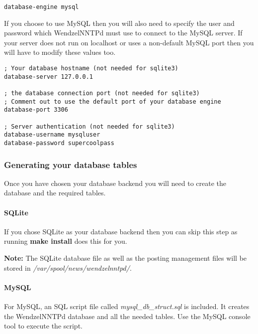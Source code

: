 \documentclass[12pt,fleqn,leqno]{scrbook}
\begin{document}
\begin{verbatim}
database-engine mysql
\end{verbatim}

If you choose to use MySQL then you will also need to specify the user
and password which WendzelNNTPd must use to connect to the MySQL server.
If your server does not run on localhost or uses a non-default MySQL
port then you will have to modify these values too.

\begin{verbatim}
; Your database hostname (not needed for sqlite3)
database-server 127.0.0.1

; the database connection port (not needed for sqlite3)
; Comment out to use the default port of your database engine
database-port 3306

; Server authentication (not needed for sqlite3)
database-username mysqluser
database-password supercoolpass
\end{verbatim}

\hypertarget{generating-your-database-tables}{%
\subsubsection{Generating your database
tables}\label{generating-your-database-tables}}

Once you have chosen your database backend you will need to create the
database and the required tables.

\hypertarget{sqlite}{%
\paragraph{SQLite}\label{sqlite}}

If you chose SQLite as your database backend then you can skip this step
as running \textbf{make install} does this for you.

\textbf{Note:} The SQLite database file as well as the posting
management files will be stored in \emph{/var/spool/news/wendzelnntpd/}.

\hypertarget{mysql}{%
\paragraph{MySQL}\label{mysql}}

For MySQL, an SQL script file called \emph{mysql\_db\_struct.sql} is
included. It creates the WendzelNNTPd database and all the needed
tables. Use the MySQL console tool to execute the script.
\end{document}
